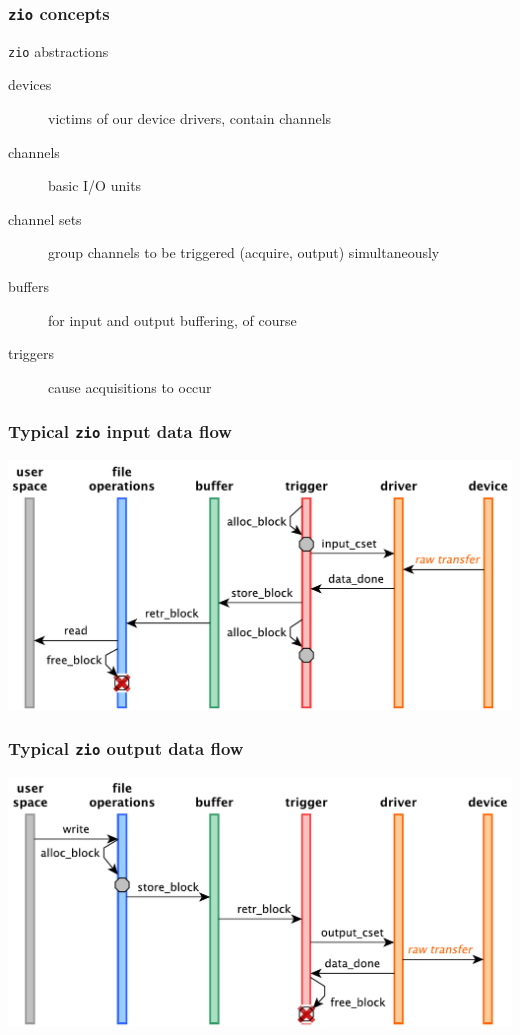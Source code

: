 \documentclass[compress,red]{beamer}
\begin{document}
\begin{frame}
\frametitle{\texttt{zio} concepts}

\begin{block}{\texttt{zio} abstractions}
\begin{description}
\item[devices] victims of our device drivers, contain channels
\item[channels] basic I/O units
\item[channel sets] group channels to be triggered (acquire, output)
	simultaneously
\item[buffers] for input and output buffering, of course
\item[triggers] cause acquisitions to occur
\end{description}
\end{block}

\end{frame}

\begin{frame}
\frametitle{Typical \texttt{zio} input data flow}
\includegraphics[height=0.8\textheight]{flow-temp-in.pdf}
\end{frame}

\begin{frame}
\frametitle{Typical \texttt{zio} output data flow}
\includegraphics[height=0.8\textheight]{flow-temp-out.pdf}
\end{frame}
\end{document}
